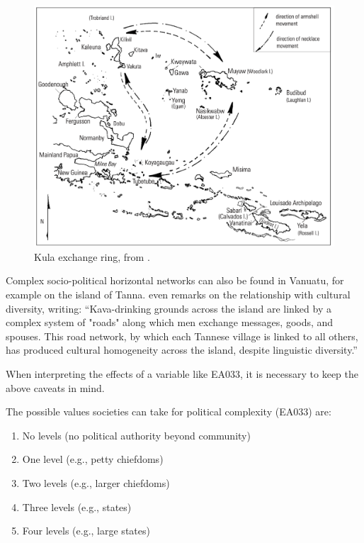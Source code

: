\documentclass[unnumsec,webpdf,modern,medium]{oup-authoring-template}
\begin{document}
\begin{appendices}
\begin{figure}[ht]
\centering
\includegraphics[width=\textwidth]{latex/kula_ring_damon}
\caption{Kula exchange ring, from \citet{damon2002kula}.}
\label{kula_ring}
\end{figure}

Complex socio-political horizontal networks can also be found in Vanuatu, for example on the island of Tanna. \citet[314]{lindstroem1991} even remarks on the relationship with cultural diversity, writing: ``Kava-drinking grounds across the island are linked by a complex system of "roads" along which men exchange messages, goods, and spouses. This road network, by which each Tannese village is linked to all others, has produced cultural homogeneity across the island, despite linguistic diversity.''

When interpreting the effects of a variable like EA033, it is necessary to keep the above caveats in mind.

The possible values societies can take for political complexity (EA033) are:

\begin{enumerate}
\item No levels (no political authority beyond community)
\item One level (e.g., petty chiefdoms)
\item Two levels (e.g., larger chiefdoms)
\item Three levels (e.g., states) 
\item Four levels (e.g., large states)
\end{enumerate}


\end{appendices}
\end{document}
